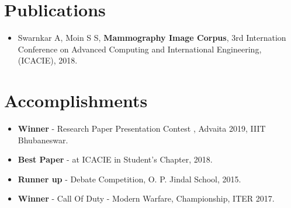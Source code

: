 \documentclass[letterpaper,11pt]{article}
\newcommand{\resumeItem}[2]{
  \item\small{
    \textbf{#1}{ #2 \vspace{-2pt}}
  }
}
\newcommand{\resumeSubItem}[2]{\resumeItem{#1}{#2}\vspace{-4pt}}
\newcommand{\resumeSubHeadingListStart}{\begin{itemize}[leftmargin=*]}
\newcommand{\resumeSubHeadingListEnd}{\end{itemize}}
\begin{document}
\section{Publications}
 \resumeSubHeadingListStart
  \resumeSubItem{}{Swarnkar A, Moin S S,
  \textbf{Mammography Image Corpus}, 3rd Internation Conference on Advanced Computing and International Engineering, (ICACIE), 2018.}
 \resumeSubHeadingListEnd

\section{Accomplishments}
 \resumeSubHeadingListStart
 \resumeSubItem{}{
    \textbf{Winner}{ - Research Paper Presentation Contest} {, Advaita 2019, IIIT Bhubaneswar.}
    }
    \resumeSubItem{}{
    \textbf{Best Paper}{ - at ICACIE in Student's Chapter}{, 2018. }
    }
    \resumeSubItem{}{
    \textbf{Runner up}{ - Debate Competition, O. P. Jindal School, 2015.}
    }
    \resumeSubItem{}{
    \textbf{Winner}{ - Call Of Duty - Modern Warfare, Championship, ITER 2017.}
    }
    
 \resumeSubHeadingListEnd
\end{document}
